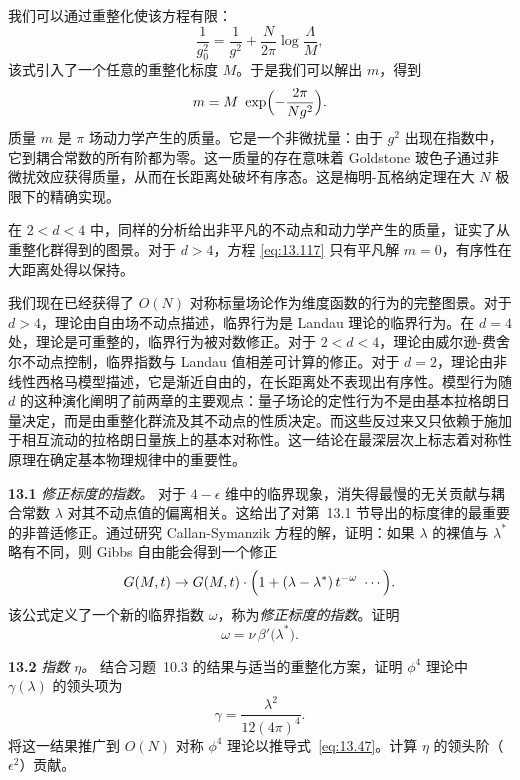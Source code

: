我们可以通过重整化使该方程有限：
\begin{equation}
  \frac{1}{g_0^2} = \frac{1}{g^2} + \frac{N}{2\pi}\log\frac{\Lambda}{M} ,
  \label{eq:13.119}
\end{equation}
该式引入了一个任意的重整化标度 $M$。于是我们可以解出 $m$，得到
\begin{equation}
  m = M\ \exp\Bigl( -\frac{2\pi}{N g^2} \Bigr) .
  \label{eq:13.120}
\end{equation}
质量 $m$ 是 $\pi$ 场动力学产生的质量。它是一个非微扰量：由于 $g^2$ 出现在指数中，它到耦合常数的所有阶都为零。这一质量的存在意味着 Goldstone 玻色子通过非微扰效应获得质量，从而在长距离处破坏有序态。这是梅明-瓦格纳定理在大 $N$ 极限下的精确实现。

在 $2 < d < 4$ 中，同样的分析给出非平凡的不动点和动力学产生的质量，证实了从重整化群得到的图景。对于 $d > 4$，方程 \eqref{eq:13.117} 只有平凡解 $m = 0$，有序性在大距离处得以保持。

我们现在已经获得了 $O(N)$ 对称标量场论作为维度函数的行为的完整图景。对于 $d > 4$，理论由自由场不动点描述，临界行为是 Landau 理论的临界行为。在 $d = 4$ 处，理论是可重整的，临界行为被对数修正。对于 $2 < d < 4$，理论由威尔逊-费舍尔不动点控制，临界指数与 Landau 值相差可计算的修正。对于 $d = 2$，理论由非线性西格马模型描述，它是渐近自由的，在长距离处不表现出有序性。模型行为随 $d$ 的这种演化阐明了前两章的主要观点：量子场论的定性行为不是由基本拉格朗日量决定，而是由重整化群流及其不动点的性质决定。而这些反过来又只依赖于施加于相互流动的拉格朗日量族上的基本对称性。这一结论在最深层次上标志着对称性原理在确定基本物理规律中的重要性。

\problems

\textbf{13.1} \emph{修正标度的指数。} 对于 $4-\epsilon$ 维中的临界现象，消失得最慢的无关贡献与耦合常数 $\lambda$ 对其不动点值的偏离相关。这给出了对第~13.1 节导出的标度律的最重要的非普适修正。通过研究 Callan-Symanzik 方程的解，证明：如果 $\lambda$ 的裸值与 $\lambda^{*}$ 略有不同，则 Gibbs 自由能会得到一个修正
\begin{equation}
  G(M,t) \to G(M,t)\cdot\Bigl( 1 + (\lambda-\lambda^{*})\,
    t^{-\omega}\ \cdots \Bigr) .
\end{equation}
该公式定义了一个新的临界指数 $\omega$，称为\emph{修正标度的指数}。证明
\begin{equation}
  \omega = \nu\,\beta'\bigl( \lambda^{*} \bigr) .
\end{equation}

\textbf{13.2} \emph{指数 $\eta$。} 结合习题~10.3 的结果与适当的重整化方案，证明 $\phi^4$ 理论中 $\gamma(\lambda)$ 的领头项为
\begin{equation}
  \gamma = \frac{\lambda^2}{12(4\pi)^4} .
\end{equation}
将这一结果推广到 $O(N)$ 对称 $\phi^4$ 理论以推导式~\eqref{eq:13.47}。计算 $\eta$ 的领头阶（$\epsilon^2$）贡献。

